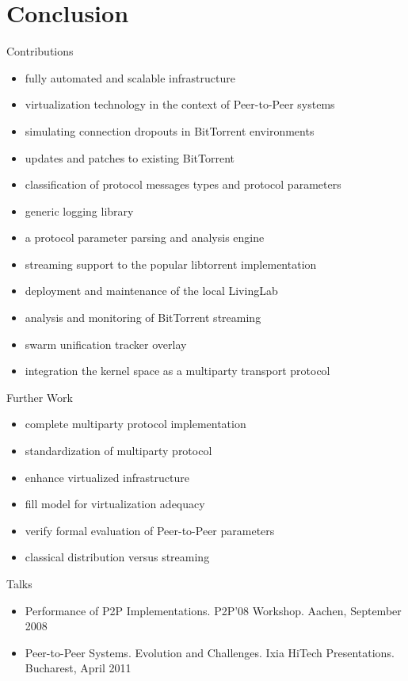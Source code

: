 \documentclass{beamer}
\begin{document}
\section{Conclusion}

\begin{frame}{Contributions}
  \begin{itemize}
    \item fully automated and scalable infrastructure
    \item virtualization technology in the context of Peer-to-Peer systems
    \item simulating connection dropouts in BitTorrent environments
    \item updates and patches to existing BitTorrent
    \item classification of protocol messages types and protocol parameters
    \item generic logging library
    \item a protocol parameter parsing and analysis engine
    \item streaming support to the popular libtorrent implementation
    \item deployment and maintenance of the local LivingLab
    \item analysis and monitoring of BitTorrent streaming
    \item swarm unification tracker overlay
    \item integration the kernel space as a multiparty transport protocol
  \end{itemize}
\end{frame}

\begin{frame}{Further Work}
  \begin{itemize}
    \item complete multiparty protocol implementation
    \item standardization of multiparty protocol
    \item enhance virtualized infrastructure
    \item fill model for virtualization adequacy
    \item verify formal evaluation of Peer-to-Peer parameters
    \item classical distribution versus streaming
  \end{itemize}
\end{frame}

\begin{frame}{Talks}
  \begin{itemize}
    \item Performance of P2P Implementations. P2P'08 Workshop. Aachen, September
    2008
    \item Peer-to-Peer Systems. Evolution and Challenges. Ixia HiTech
    Presentations. Bucharest, April 2011
  \end{itemize}
\end{frame}
\end{document}
